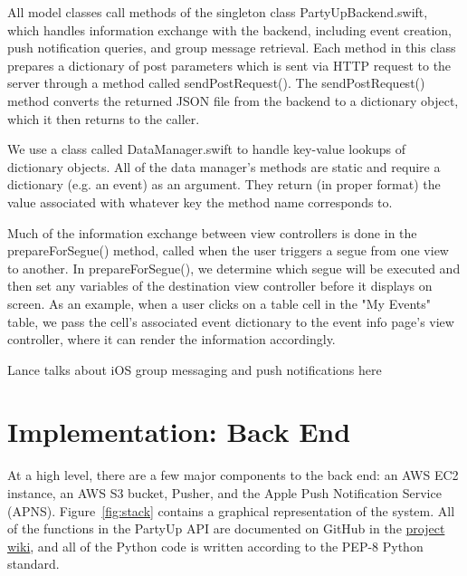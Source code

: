 \documentclass[12pt]{article}
\begin{document}
All model classes call methods of the singleton class PartyUpBackend.swift, which handles information exchange with the backend, including event creation, push notification queries, and group message retrieval. Each method in this class prepares a dictionary of post parameters which is sent via HTTP request to the server through a method called sendPostRequest(). The sendPostRequest() method converts the returned JSON file from the backend to a dictionary object, which it then returns to the caller.

\bigskip

We use a class called DataManager.swift to handle key-value lookups of dictionary objects. All of the data manager's methods are static and require a dictionary (e.g. an event) as an argument. They return (in proper format) the value associated with whatever key the method name corresponds to. 

\bigskip

Much of the information exchange between view controllers is done in the prepareForSegue() method, called when the user triggers a segue from one view to another. In prepareForSegue(), we determine which segue will be executed and then set any variables of the destination view controller before it displays on screen. As an example, when a user clicks on a table cell in the "My Events" table, we pass the cell's associated event dictionary to the event info page's view controller, where it can render the information accordingly. 

\bigskip

Lance talks about iOS group messaging and push notifications here


\section{Implementation: Back End}

At a high level, there are a few major components to the back end:
an AWS EC2 instance, an AWS S3 bucket, Pusher, and the Apple Push Notification Service (APNS).
Figure~\ref{fig:stack} contains a graphical representation of the system.
All of the functions in the PartyUp API are documented on GitHub
in the \href{https://github.com/BDGL-Hacks/backend-333/wiki}{project wiki},
and all of the Python code is written according to the PEP-8 Python standard.
\end{document}
